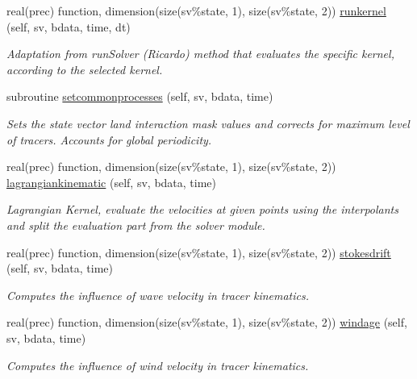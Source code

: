 \begin{DoxyCompactItemize}
\item 
real(prec) function, dimension(size(sv\%state, 1), size(sv\%state, 2)) \mbox{\hyperlink{namespacekernel__mod_ae17673ed6d32a4e7f6e54276e6430cc9}{runkernel}} (self, sv, bdata, time, dt)
\begin{DoxyCompactList}\small\item\em Adaptation from run\+Solver (Ricardo) method that evaluates the specific kernel, according to the selected kernel. \end{DoxyCompactList}\item 
subroutine \mbox{\hyperlink{namespacekernel__mod_a1032cd0a40cff8301fcf2ca880c81039}{setcommonprocesses}} (self, sv, bdata, time)
\begin{DoxyCompactList}\small\item\em Sets the state vector land interaction mask values and corrects for maximum level of tracers. Accounts for global periodicity. \end{DoxyCompactList}\item 
real(prec) function, dimension(size(sv\%state, 1), size(sv\%state, 2)) \mbox{\hyperlink{namespacekernel__mod_a7a181eab538ac32b3bddcf4bb34503bd}{lagrangiankinematic}} (self, sv, bdata, time)
\begin{DoxyCompactList}\small\item\em Lagrangian Kernel, evaluate the velocities at given points using the interpolants and split the evaluation part from the solver module. \end{DoxyCompactList}\item 
real(prec) function, dimension(size(sv\%state, 1), size(sv\%state, 2)) \mbox{\hyperlink{namespacekernel__mod_a69811135e6a881c537873c59451f689e}{stokesdrift}} (self, sv, bdata, time)
\begin{DoxyCompactList}\small\item\em Computes the influence of wave velocity in tracer kinematics. \end{DoxyCompactList}\item 
real(prec) function, dimension(size(sv\%state, 1), size(sv\%state, 2)) \mbox{\hyperlink{namespacekernel__mod_ae9cf0f11335d49476ce48a37c2fbde83}{windage}} (self, sv, bdata, time)
\begin{DoxyCompactList}\small\item\em Computes the influence of wind velocity in tracer kinematics. \end{DoxyCompactList}\item 

\end{DoxyCompactItemize}
